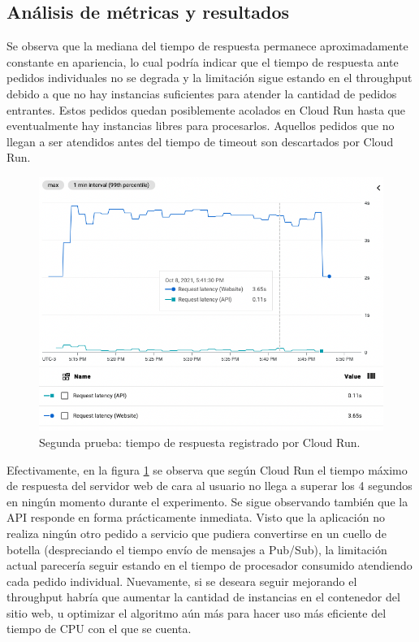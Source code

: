 \documentclass[11pt]{scrartcl}
\begin{document}
\subsection{Análisis de métricas y resultados}

Se observa que la mediana del tiempo de respuesta permanece aproximadamente constante en apariencia, lo cual podría indicar que el tiempo de respuesta ante pedidos individuales no se degrada y la limitación sigue estando en el throughput debido a que no hay instancias suficientes para atender la cantidad de pedidos entrantes. Estos pedidos quedan posiblemente acolados en Cloud Run hasta que eventualmente hay instancias libres para procesarlos. Aquellos pedidos que no llegan a ser atendidos antes del tiempo de timeout son descartados por Cloud Run.

\begin{figure}
\centering
\includegraphics[scale=0.44]{img3/cloud-run-request-latency}
\caption{Segunda prueba: tiempo de respuesta registrado por Cloud Run.}
\label{fig:test-2-cloud-run-response-times}
\end{figure}

Efectivamente, en la figura \ref{fig:test-2-cloud-run-response-times} se observa que según Cloud Run el tiempo máximo de respuesta del servidor web de cara al usuario no llega a superar los 4 segundos en ningún momento durante el experimento. Se sigue observando también que la API responde en forma prácticamente inmediata. Visto que la aplicación no realiza ningún otro pedido a servicio que pudiera convertirse en un cuello de botella (despreciando el tiempo envío de mensajes a Pub/Sub), la limitación actual parecería seguir estando en el tiempo de procesador consumido atendiendo cada pedido individual. Nuevamente, si se deseara seguir mejorando el throughput habría que aumentar la cantidad de instancias en el contenedor del sitio web, u optimizar el algoritmo aún más para hacer uso más eficiente del tiempo de CPU con el que se cuenta.
\end{document}
